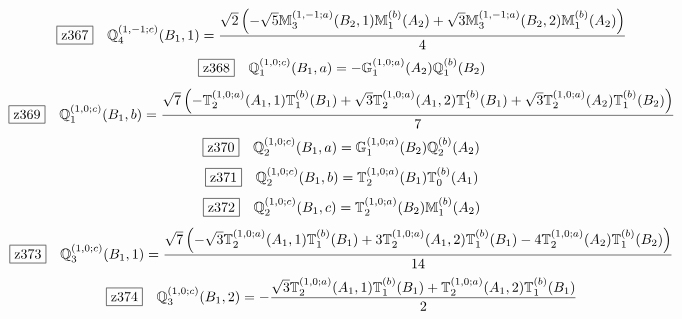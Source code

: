 \documentclass[fleqn,10pt,landscape]{jsarticle}
\begin{document}
\begin{dmath*}
\hspace*{3mm}\fbox{z367}\quad \mathbb{Q}_{4}^{(1,-1;c)}(B_{1},1)=\frac{\sqrt{2} \left(- \sqrt{5} \mathbb{M}_{3}^{(1,-1;a)}(B_{2},1) \mathbb{M}_{1}^{(b)}(A_{2}) + \sqrt{3} \mathbb{M}_{3}^{(1,-1;a)}(B_{2},2) \mathbb{M}_{1}^{(b)}(A_{2})\right)}{4}
\end{dmath*}
\begin{dmath*}
\hspace*{3mm}\fbox{z368}\quad \mathbb{Q}_{1}^{(1,0;c)}(B_{1},a)=- \mathbb{G}_{1}^{(1,0;a)}(A_{2}) \mathbb{Q}_{1}^{(b)}(B_{2})
\end{dmath*}
\begin{dmath*}
\hspace*{3mm}\fbox{z369}\quad \mathbb{Q}_{1}^{(1,0;c)}(B_{1},b)=\frac{\sqrt{7} \left(- \mathbb{T}_{2}^{(1,0;a)}(A_{1},1) \mathbb{T}_{1}^{(b)}(B_{1}) + \sqrt{3} \mathbb{T}_{2}^{(1,0;a)}(A_{1},2) \mathbb{T}_{1}^{(b)}(B_{1}) + \sqrt{3} \mathbb{T}_{2}^{(1,0;a)}(A_{2}) \mathbb{T}_{1}^{(b)}(B_{2})\right)}{7}
\end{dmath*}
\begin{dmath*}
\hspace*{3mm}\fbox{z370}\quad \mathbb{Q}_{2}^{(1,0;c)}(B_{1},a)=\mathbb{G}_{1}^{(1,0;a)}(B_{2}) \mathbb{Q}_{2}^{(b)}(A_{2})
\end{dmath*}
\begin{dmath*}
\hspace*{3mm}\fbox{z371}\quad \mathbb{Q}_{2}^{(1,0;c)}(B_{1},b)=\mathbb{T}_{2}^{(1,0;a)}(B_{1}) \mathbb{T}_{0}^{(b)}(A_{1})
\end{dmath*}
\begin{dmath*}
\hspace*{3mm}\fbox{z372}\quad \mathbb{Q}_{2}^{(1,0;c)}(B_{1},c)=\mathbb{T}_{2}^{(1,0;a)}(B_{2}) \mathbb{M}_{1}^{(b)}(A_{2})
\end{dmath*}
\begin{dmath*}
\hspace*{3mm}\fbox{z373}\quad \mathbb{Q}_{3}^{(1,0;c)}(B_{1},1)=\frac{\sqrt{7} \left(- \sqrt{3} \mathbb{T}_{2}^{(1,0;a)}(A_{1},1) \mathbb{T}_{1}^{(b)}(B_{1}) + 3 \mathbb{T}_{2}^{(1,0;a)}(A_{1},2) \mathbb{T}_{1}^{(b)}(B_{1}) - 4 \mathbb{T}_{2}^{(1,0;a)}(A_{2}) \mathbb{T}_{1}^{(b)}(B_{2})\right)}{14}
\end{dmath*}
\begin{dmath*}
\hspace*{3mm}\fbox{z374}\quad \mathbb{Q}_{3}^{(1,0;c)}(B_{1},2)=- \frac{\sqrt{3} \mathbb{T}_{2}^{(1,0;a)}(A_{1},1) \mathbb{T}_{1}^{(b)}(B_{1}) + \mathbb{T}_{2}^{(1,0;a)}(A_{1},2) \mathbb{T}_{1}^{(b)}(B_{1})}{2}
\end{dmath*}
\end{document}
